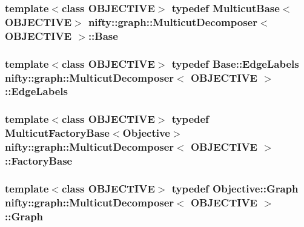 \subsubsection[{Base}]{\setlength{\rightskip}{0pt plus 5cm}template$<$class O\+B\+J\+E\+C\+T\+I\+V\+E$>$ typedef {\bf Multicut\+Base}$<$O\+B\+J\+E\+C\+T\+I\+V\+E$>$ {\bf nifty\+::graph\+::\+Multicut\+Decomposer}$<$ O\+B\+J\+E\+C\+T\+I\+V\+E $>$\+::{\bf Base}}\label{classnifty_1_1graph_1_1MulticutDecomposer_af89f31868f0b51f25e395fdc9b8ce497}
\hypertarget{classnifty_1_1graph_1_1MulticutDecomposer_ab4762e27c2072ee4d368d1db605d77a3}{}
\subsubsection[{Edge\+Labels}]{\setlength{\rightskip}{0pt plus 5cm}template$<$class O\+B\+J\+E\+C\+T\+I\+V\+E$>$ typedef {\bf Base\+::\+Edge\+Labels} {\bf nifty\+::graph\+::\+Multicut\+Decomposer}$<$ O\+B\+J\+E\+C\+T\+I\+V\+E $>$\+::{\bf Edge\+Labels}}\label{classnifty_1_1graph_1_1MulticutDecomposer_ab4762e27c2072ee4d368d1db605d77a3}
\hypertarget{classnifty_1_1graph_1_1MulticutDecomposer_a170cc710edca2926ff121b591105a835}{}
\subsubsection[{Factory\+Base}]{\setlength{\rightskip}{0pt plus 5cm}template$<$class O\+B\+J\+E\+C\+T\+I\+V\+E$>$ typedef {\bf Multicut\+Factory\+Base}$<${\bf Objective}$>$ {\bf nifty\+::graph\+::\+Multicut\+Decomposer}$<$ O\+B\+J\+E\+C\+T\+I\+V\+E $>$\+::{\bf Factory\+Base}}\label{classnifty_1_1graph_1_1MulticutDecomposer_a170cc710edca2926ff121b591105a835}
\hypertarget{classnifty_1_1graph_1_1MulticutDecomposer_a3bc51c62779b4df76880261bc8746d8e}{}
\subsubsection[{Graph}]{\setlength{\rightskip}{0pt plus 5cm}template$<$class O\+B\+J\+E\+C\+T\+I\+V\+E$>$ typedef Objective\+::\+Graph {\bf nifty\+::graph\+::\+Multicut\+Decomposer}$<$ O\+B\+J\+E\+C\+T\+I\+V\+E $>$\+::{\bf Graph}}\label{classnifty_1_1graph_1_1MulticutDecomposer_a3bc51c62779b4df76880261bc8746d8e}
\hypertarget{classnifty_1_1graph_1_1MulticutDecomposer_ab3e763da6e04631dabe7655a6642adab}{}
